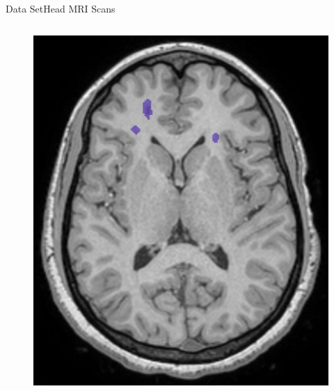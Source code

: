 \documentclass[]{standalone}
\begin{document}
\begin{frame}{Data Set}{Head MRI Scans}
\begin{columns}
\begin{column}{0.52\textwidth}
\begin{figure}[h!]
			\includegraphics[scale = 0.058]{./IMG/gnd_labels.png}
		\end{figure}
		
		
		\end{column}
	\end{columns}
	\end{frame}
\end{document}
